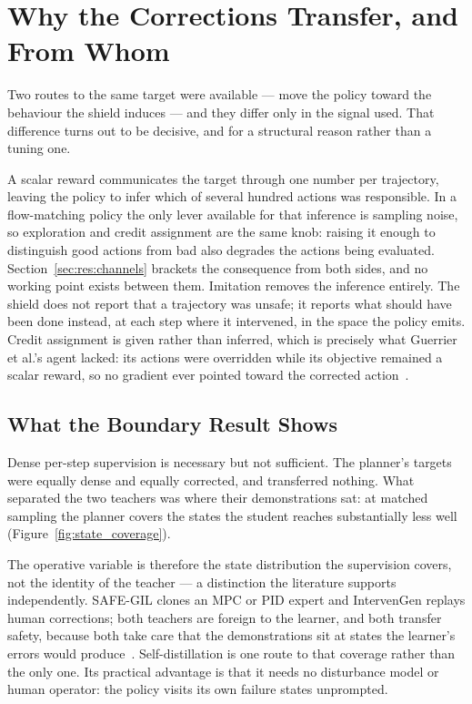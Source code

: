 \section{Why the Corrections Transfer, and From Whom}\label{sec:disc:transfer}

Two routes to the same target were available --- move the policy toward the behaviour the shield
induces --- and they differ only in the signal used. That difference turns out to be decisive, and
for a structural reason rather than a tuning one.

A scalar reward communicates the target through one number per trajectory, leaving the policy to
infer which of several hundred actions was responsible. In a flow-matching policy the only lever
available for that inference is sampling noise, so exploration and credit assignment are the same
knob: raising it enough to distinguish good actions from bad also degrades the actions being
evaluated. Section~\ref{sec:res:channels} brackets the consequence from both sides, and no working
point exists between them. Imitation removes the inference entirely. The shield does not report
that a trajectory was unsafe; it reports what should have been done instead, at each step where it
intervened, in the space the policy emits. Credit assignment is given rather than inferred, which
is precisely what Guerrier et al.'s agent lacked: its actions were overridden while its objective
remained a scalar reward, so no gradient ever pointed toward the corrected
action~\cite{guerrier2025guardrails}.

\subsection*{What the Boundary Result Shows}

Dense per-step supervision is necessary but not sufficient. The planner's targets were equally
dense and equally corrected, and transferred nothing. What separated the two teachers was where
their demonstrations sat: at matched sampling the planner covers the states the student reaches
substantially less well (Figure~\ref{fig:state_coverage}).

The operative variable is therefore the state distribution the supervision covers, not the identity
of the teacher --- a distinction the literature supports independently. SAFE-GIL clones an MPC or
PID expert and IntervenGen replays human corrections; both teachers are foreign to the learner, and
both transfer safety, because both take care that the demonstrations sit at states the learner's
errors would produce~\cite{ciftci2025safegil,hoque2024intervengen}. Self-distillation is one route
to that coverage rather than the only one. Its practical advantage is that it needs no disturbance
model or human operator: the policy visits its own failure states unprompted.

